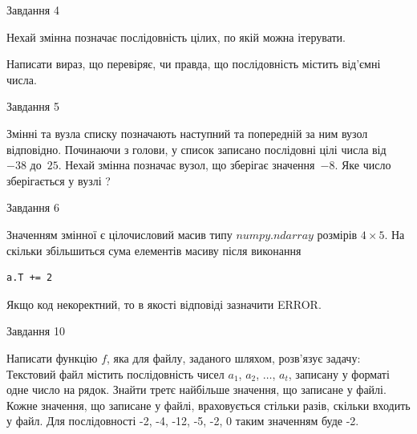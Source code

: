 \documentclass[12pt, ukrainian]{article}
\begin{document}
{\begin{minipage}[t]{8.0cm}
\begin{verbatim}
\end{verbatim}            

\end{minipage}


               
{\begin{center}Завдання {4}\end{center}}
\vspace{-4mm}
Нехай змінна  позначає послідовність цілих, по якій можна ітерувати.

Написати вираз, що перевіряє, чи правда, що послідовність  містить від’ємні числа.\par

\vspace{10mm}
               
{\begin{center}Завдання {5}\end{center}}
\vspace{-4mm}
Змінні  та  вузла списку позначають наступний та попередній за ним вузол відповідно. Починаючи з голови, у список записано послідовні цілі числа від~$-38$ до~$25$. Нехай змінна  позначає вузол, що зберігає значення~$-8$.
Яке число зберігається у вузлі  ?\par

               
{\begin{center}Завдання {6}\end{center}}
\vspace{-4mm}
Значенням змінної  є цілочисловий масив типу $numpy.ndarray$ розмірів $4{\times}5$. На скільки збільшиться сума елементів масиву  після виконання
\begin{verbatim}
a.T += 2
\end{verbatim}


Якщо код некоректний, то в якості відповіді зазначити ERROR.\par

               
{\begin{center}Завдання {10}\end{center}}
\vspace{-4mm}

Написати функцію $f$, яка для файлу, заданого шляхом, розв’язує задачу:\\ Текстовий файл містить послідовність чисел $a_1$, $a_2$, $\ldots$, $a_t$, записану у форматі одне число на рядок. Знайти третє найбільше значення, що записане у файлі. Кожне значення, що записане у файлі, враховується стільки разів, скільки входить у файл. Для послідовності -2, -4, -12, -5, -2, 0 таким значенням буде -2.

}
\end{document}
